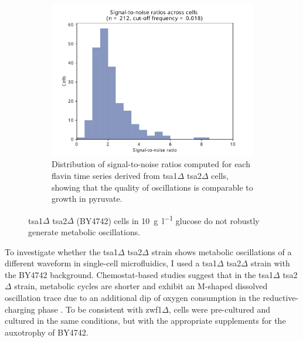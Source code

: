 \begin{figure}
  \begin{subfigure}[t]{0.45\textwidth}
   \centering
   \includegraphics[width=\textwidth]{tsa1tsa2morgan_1649_10.pdf}
   \caption{
    Distribution of signal-to-noise ratios computed for each flavin time series derived from tsa1$\Delta$ tsa2$\Delta$ cells, showing that the quality of oscillations is comparable to growth in pyruvate.
   }
   \label{fig:biology-tsa1tsa2-snr}
  \end{subfigure}%

  \caption{
    tsa1$\Delta$ tsa2$\Delta$ (BY4742) cells in \SI{10}{\gram~\litre^{-1}} glucose do not robustly generate metabolic oscillations.
  }
  \label{fig:biology-tsa1tsa2}
\end{figure}


To investigate whether the tsa1$\Delta$ tsa2$\Delta$ strain shows metabolic oscillations of a different waveform in single-cell microfluidics, I used a tsa1$\Delta$ tsa2$\Delta$ strain with the BY4742 background.
Chemostat-based studies suggest that in the tsa1$\Delta$ tsa2$\Delta$ strain, metabolic cycles are shorter and exhibit an M-shaped dissolved oscillation trace due to an additional dip of oxygen consumption in the reductive-charging phase \parencite{caustonMetabolicCyclesYeast2015}.
To be consistent with zwf1$\Delta$, cells were pre-cultured and cultured in the same conditions, but with the appropriate supplements for the auxotrophy of BY4742.
%


